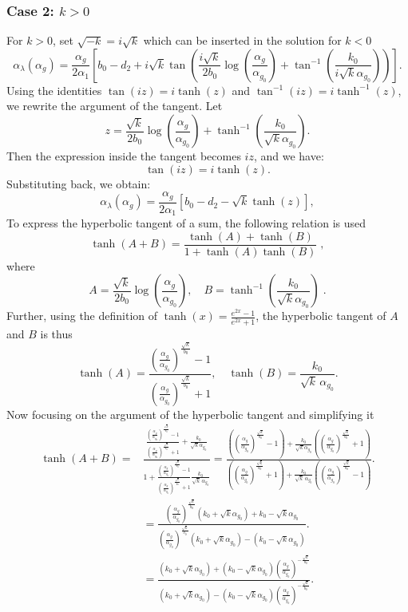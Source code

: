 \subsubsection*{Case 2: $k > 0$}
For $k>0$, set $\sqrt{-k} = i\sqrt{k}$ which can be inserted in the solution for $k<0$
\[
\alpha_{\lambda}(\alpha_g) = \frac{\alpha_g}{2\alpha_1} \left[ b_0 - d_2 + i\sqrt{k} \tan \left( \frac{i\sqrt{k}}{2b_0} \log \left( \frac{\alpha_g}{\alpha_{g_0}} \right) + \tan^{-1} \left( \frac{k_0}{i\sqrt{k} \alpha_{g_0}} \right) \right) \right].
\]
Using the identities \(\tan(iz) = i\tanh(z)\) and \(\tan^{-1}(iz) = i\tanh^{-1}(z)\), we rewrite the argument of the tangent. Let
\[
z = \frac{\sqrt{k}}{2b_0} \log \left( \frac{\alpha_g}{\alpha_{g_0}} \right) + \tanh^{-1} \left( \frac{k_0}{\sqrt{k} \alpha_{g_0}} \right).
\]
Then the expression inside the tangent becomes \(i z\), and we have:
\[
\tan(i z) = i\tanh(z).
\]
Substituting back, we obtain:
\[
\alpha_{\lambda}(\alpha_g) = \frac{\alpha_g}{2\alpha_1} \left[ b_0 - d_2 - \sqrt{k} \tanh(z) \right],
\]
To express the hyperbolic tangent of a sum, the following relation is used
\[
\tanh(A+B) = \frac{\tanh(A) + \tanh(B)}{1 + \tanh(A)\tanh(B)}\;,
\]
where
\[
A = \frac{\sqrt{k}}{2b_0} \log \left( \frac{\alpha_g}{\alpha_{g_0}} \right), \quad 
B = \tanh^{-1} \left( \frac{k_0}{\sqrt{k}\alpha_{g_0}} \right)\;.
\]
Further, using the definition of $\tanh\left(x\right)=\frac{e^{2x}-1}{e^{2x}+1}$, the hyperbolic tangent of $A$ and $B$ is thus
\[
\tanh(A) = \frac{ \left( \frac{\alpha_g}{\alpha_{g_0}} \right)^{\frac{\sqrt{k}}{b_0}} - 1 }{ \left(  \frac{\alpha_g}{\alpha_{g_0}}\right)^{\frac{\sqrt{k}}{b_0}} + 1 }, \quad 
\tanh(B) = \frac{k_0}{\sqrt{k} \, \alpha_{g_0}}.
\]
Now focusing on the argument of the hyperbolic tangent and simplifying it
\begin{align*}
    \tanh(A+B)=&\frac{ \frac{ \left( \frac{\alpha_g}{\alpha_{g_0}}\right)^{\frac{\sqrt{k}}{b_0}} - 1 }{ \left(\frac{\alpha_g}{\alpha_{g_0}} \right)^{\frac{\sqrt{k}}{b_0}} + 1 } + \frac{k_0}{\sqrt{k} \alpha_{g_0}} }{ 1 +\frac{ \left( \frac{\alpha_g}{\alpha_{g_0}} \right)^{\frac{\sqrt{k}}{b_0}} - 1 }{ \left(\frac{\alpha_g}{\alpha_{g_0}} \right)^{\frac{\sqrt{k}}{b_0}} + 1 }  \frac{k_0}{\sqrt{k} \, \alpha_{g_0}} }
    = \frac{
  \left( \left( \frac{\alpha_g}{\alpha_{g_0}}  \right)^{\frac{\sqrt{k}}{b_0}} - 1 \right) 
  + \frac{k_0}{\sqrt{k}\alpha_{g_0}} \left( \left( \frac{\alpha_g}{\alpha_{g_0}} \right)^{\frac{\sqrt{k}}{b_0}} + 1 \right)
}{
  \left( \left( \frac{\alpha_g}{\alpha_{g_0}}  \right)^{\frac{\sqrt{k}}{b_0}} + 1 \right) 
  + \frac{k_0}{\sqrt{k} \, \alpha_{g_0}} \left( \left( \frac{\alpha_g}{\alpha_{g_0}}  \right)^{\frac{\sqrt{k}}{b_0}} - 1 \right)
}.\\&=  \frac{
  \left(  \frac{\alpha_g}{\alpha_{g_0}}  \right)^{\frac{\sqrt{k}}{b_0}} (k_0+\sqrt{k}\alpha_{g_0})+k_0- \sqrt{k}\alpha_{g_0} 
}{
  \left(  \frac{\alpha_g}{\alpha_{g_0}}  \right)^{\frac{\sqrt{k}}{b_0}} (k_0+\sqrt{k}\alpha_{g_0})-(k_0- \sqrt{k}\alpha_{g_0} )
}.
\\&=  \frac{
   (k_0+\sqrt{k}\alpha_{g_0})+(k_0- \sqrt{k}\alpha_{g_0})\left(  \frac{\alpha_g}{\alpha_{g_0}}  \right)^{-\frac{\sqrt{k}}{b_0}}
}{
  (k_0+\sqrt{k}\alpha_{g_0})-(k_0- \sqrt{k}\alpha_{g_0} )\left(  \frac{\alpha_g}{\alpha_{g_0}}  \right)^{-\frac{\sqrt{k}}{b_0}} 
}.
\end{align*}

